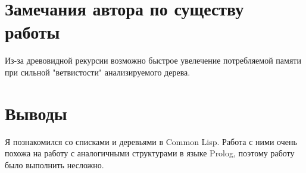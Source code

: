 \documentclass[12pt]{article}
\begin{document}
\section{Замечания автора по существу работы}
Из-за древовидной рекурсии возможно быстрое увелечение потребляемой памяти при сильной "ветвистости" анализируемого дерева.

\section{Выводы}
Я познакомился со списками и деревьями в Common Lisp. Работа с ними очень похожа на работу с аналогичными структурами в языке Prolog,
поэтому работу было выполнить несложно.
\end{document}
